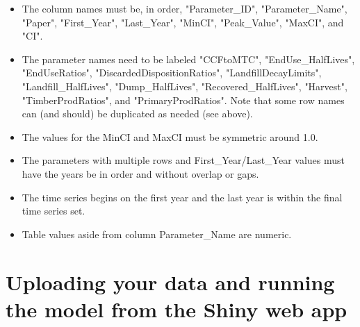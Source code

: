 \documentclass[
  openany]{book}
\providecommand{\tightlist}{%
  \setlength{\itemsep}{0pt}\setlength{\parskip}{0pt}}
\begin{document}
\begin{itemize}
\tightlist
\item
  The column names must be, in order, "Parameter\_ID", "Parameter\_Name", "Paper", "First\_Year", "Last\_Year", "MinCI", "Peak\_Value", "MaxCI", and "CI".\\
\item
  The parameter names need to be labeled "CCFtoMTC", "EndUse\_HalfLives", "EndUseRatios", "DiscardedDispositionRatios", "LandfillDecayLimits", "Landfill\_HalfLives", "Dump\_HalfLives", "Recovered\_HalfLives", "Harvest", "TimberProdRatios", and "PrimaryProdRatios". Note that some row names can (and should) be duplicated as needed (see above).\\
\item
  The values for the MinCI and MaxCI must be symmetric around 1.0.\\
\item
  The parameters with multiple rows and First\_Year/Last\_Year values must have the years be in order and without overlap or gaps.\\
\item
  The time series begins on the first year and the last year is within the final time series set.\\
\item
  Table values aside from column Parameter\_Name are numeric.
\end{itemize}

\hypertarget{own-shiny}{%
\section{Uploading your data and running the model from the Shiny web app}\label{own-shiny}}
\end{document}
